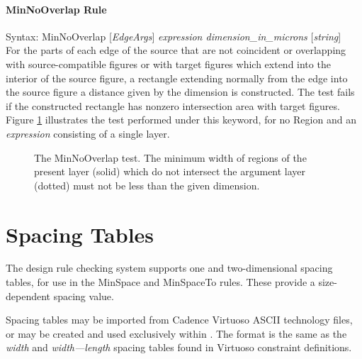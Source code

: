 \paragraph{{\et MinNoOverlap} Rule}

\begin{description}
\item{Syntax: {\vt MinNoOverlap} [{\it EdgeArgs\/}]
    {\it expression dimension\_in\_microns} [{\it string\/}]}\\

For the parts of each edge of the source that are not coincident or
overlapping with source-compatible figures or with target figures
which extend into the interior of the source figure, a rectangle
extending normally from the edge into the source figure a distance
given by the dimension is constructed.  The test fails if the
constructed rectangle has nonzero intersection area with target
figures.  Figure \ref{drcminnooverlap} illustrates the test performed
under this keyword, for no {\et Region} and an {\it expression}
consisting of a single layer.
\end{description}

\begin{figure}
\caption{\label{drcminnooverlap} The {\et MinNoOverlap} test.  The minimum
width of regions of the present layer (solid) which do not intersect the
argument layer (dotted) must not be less than the given dimension.}
\vspace{1.5ex}
\begin{center}
\end{center}
\end{figure}


\section{Spacing Tables}
\label{spacetab}
The design rule checking system supports one and two-dimensional
spacing tables, for use in the {\et MinSpace} and {\et MinSpaceTo}
rules.  These provide a size-dependent spacing value.

Spacing tables may be imported from Cadence Virtuoso ASCII technology
files, or may be created and used exclusively within {\Xic}.  The
format is the same as the {\it width} and {\it width---length} spacing
tables found in Virtuoso constraint definitions.

